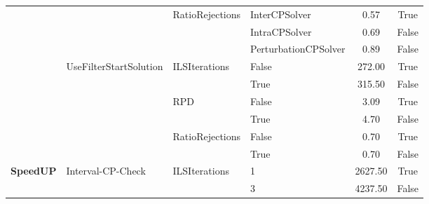 \begin{table}[!ht]
\begin{tabular}{@{}l l l l c c @{}}
		                                      &                                              & \multirow[t]{3}{*}{RatioRejections} & InterCPSolver        & 0.57            & True            \\\cmidrule(lr){4-6}
		                                      &                                              &                                     & IntraCPSolver        & 0.69            & False           \\\cmidrule(lr){4-6}
		                                      &                                              &                                     & PerturbationCPSolver & 0.89            & False           \\\cmidrule(lr){2-6}
		                                      & \multirow[t]{6}{*}{UseFilterStartSolution}   & \multirow[t]{2}{*}{ILSIterations}   & False                & 272.00          & True            \\\cmidrule(lr){4-6}
		                                      &                                              &                                     & True                 & 315.50          & False           \\\cmidrule(lr){3-6}
		                                      &                                              & \multirow[t]{2}{*}{RPD}             & False                & 3.09            & True            \\\cmidrule(lr){4-6}
		                                      &                                              &                                     & True                 & 4.70            & False           \\\cmidrule(lr){3-6}
		                                      &                                              & \multirow[t]{2}{*}{RatioRejections} & False                & 0.70            & True            \\\cmidrule(lr){4-6}
		                                      &                                              &                                     & True                 & 0.70            & False           \\\midrule
		\multirow[t]{15}{*}{\textbf{SpeedUP}} & \multirow[t]{9}{*}{Interval-CP-Check}        & \multirow[t]{3}{*}{ILSIterations}   & 1                    & 2627.50         & True            \\\cmidrule(lr){4-6}
		                                      &                                              &                                     & 3                    & 4237.50         & False           \\\cmidrule(lr){4-6}

\end{tabular}
\end{table}
